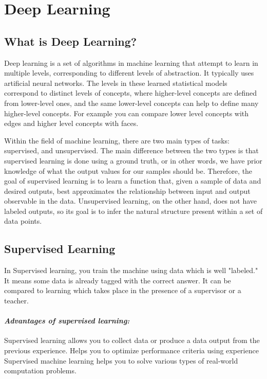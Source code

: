 
\chapter{Deep Learning\authorB}

\section{What is Deep Learning?}

Deep learning is a set of algorithms in machine
learning that attempt to learn in multiple levels, corresponding to different levels of abstraction. It typically uses artificial
neural networks. The levels in these learned statistical models
correspond to distinct levels of concepts, where higher-level concepts are defined from lower-level ones, and the same lower-level concepts can help to define many higher-level concepts. For example you can compare lower level concepts with edges and higher level concepts with faces. 

Within the field of machine learning, there are two main types of tasks: supervised, and unsupervised. The main difference between the two types is that supervised learning is done using a ground truth, or in other words, we have prior knowledge of what the output values for our samples should be. Therefore, the goal of supervised learning is to learn a function that, given a sample of data and desired outputs, best approximates the relationship between input and output observable in the data. Unsupervised learning, on the other hand, does not have labeled outputs, so its goal is to infer the natural structure present within a set of data points.

\section{Supervised Learning}

In Supervised learning, you train the machine using data which is well "labeled." It means some data is already tagged with the correct answer. It can be compared to learning which takes place in the presence of a supervisor or a teacher.

\subsubsection{\textit{Advantages of supervised learning:}}
Supervised learning allows you to collect data or produce a data output from the previous experience.
Helps you to optimize performance criteria using experience
Supervised machine learning helps you to solve various types of real-world computation problems.

